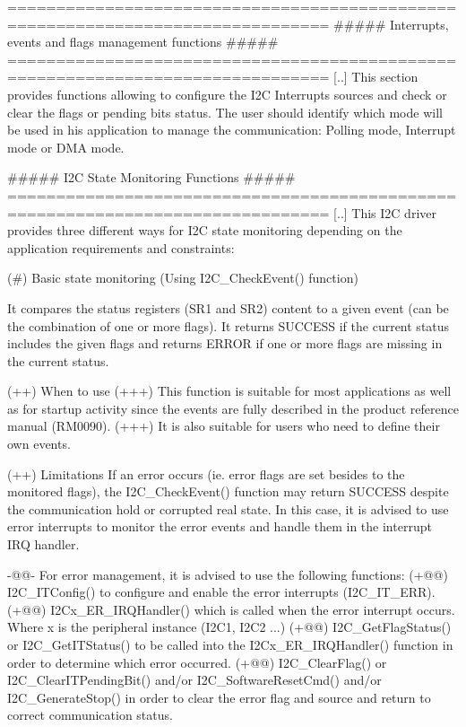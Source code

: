 \begin{DoxyVerb} ===============================================================================
          ##### Interrupts, events and flags management functions #####
 ===============================================================================
    [..]
    This section provides functions allowing to configure the I2C Interrupts 
    sources and check or clear the flags or pending bits status.
    The user should identify which mode will be used in his application to manage 
    the communication: Polling mode, Interrupt mode or DMA mode. 


                ##### I2C State Monitoring Functions #####                   
 =============================================================================== 
    [..]  
    This I2C driver provides three different ways for I2C state monitoring
    depending on the application requirements and constraints:
         
   
     (#) Basic state monitoring (Using I2C_CheckEvent() function)
     
        It compares the status registers (SR1 and SR2) content to a given event
        (can be the combination of one or more flags).
        It returns SUCCESS if the current status includes the given flags 
        and returns ERROR if one or more flags are missing in the current status.

          (++) When to use
             (+++) This function is suitable for most applications as well as for startup 
               activity since the events are fully described in the product reference 
               manual (RM0090).
             (+++) It is also suitable for users who need to define their own events.

          (++) Limitations
               If an error occurs (ie. error flags are set besides to the monitored 
               flags), the I2C_CheckEvent() function may return SUCCESS despite 
               the communication hold or corrupted real state. 
               In this case, it is advised to use error interrupts to monitor 
               the error events and handle them in the interrupt IRQ handler.
         
     -@@- For error management, it is advised to use the following functions:
        (+@@) I2C_ITConfig() to configure and enable the error interrupts (I2C_IT_ERR).
        (+@@) I2Cx_ER_IRQHandler() which is called when the error interrupt occurs.
              Where x is the peripheral instance (I2C1, I2C2 ...)
        (+@@) I2C_GetFlagStatus() or I2C_GetITStatus()  to be called into the 
              I2Cx_ER_IRQHandler() function in order to determine which error occurred.
        (+@@) I2C_ClearFlag() or I2C_ClearITPendingBit() and/or I2C_SoftwareResetCmd() 
              and/or I2C_GenerateStop() in order to clear the error flag and source 
              and return to correct  communication status.
             

\end{DoxyVerb}
